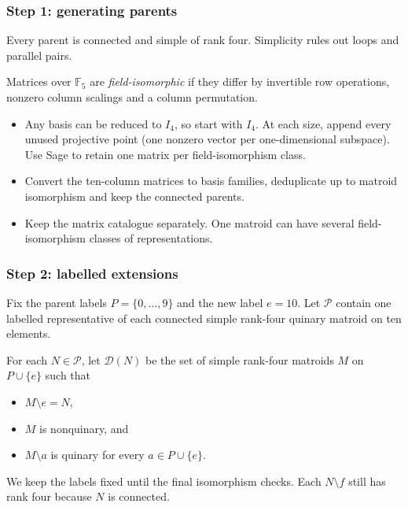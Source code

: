 \documentclass{beamer}
\newcommand{\F}{\mathbb{F}}
\begin{document}
\begin{frame}
  \frametitle{Step 1: generating parents}
  Every parent is connected and simple of rank four. Simplicity
  rules out loops and parallel pairs.

  \medskip
  Matrices over $\F_5$ are \emph{field-isomorphic} if they differ by
  invertible row operations, nonzero column scalings and a column
  permutation.
  \begin{itemize}
    \item Any basis can be reduced to $I_4$, so start with $I_4$.
      At each size, append every unused projective point (one nonzero
      vector per one-dimensional subspace). Use Sage to retain one
      matrix per field-isomorphism class.
    \item Convert the ten-column matrices to basis families, deduplicate
      up to matroid isomorphism and keep the connected parents.
    \item Keep the matrix catalogue separately. One matroid can have
      several field-isomorphism classes of representations.
  \end{itemize}
\end{frame}

\begin{frame}
  \frametitle{Step 2: labelled extensions}
  Fix the parent labels $P=\{0,\ldots,9\}$ and the new label $e=10$.
  Let $\mathcal P$ contain one labelled representative of each
  connected simple rank-four quinary matroid on ten elements.

  \medskip
  For each $N\in\mathcal P$, let $\mathcal D(N)$ be the set of simple
  rank-four matroids $M$ on $P\cup\{e\}$ such that
  \begin{itemize}
    \item $M\setminus e=N$,
    \item $M$ is nonquinary, and
    \item $M\setminus a$ is quinary for every $a\in P\cup\{e\}$.
  \end{itemize}
  We keep the labels fixed until the final isomorphism checks.
  Each $N\setminus f$ still has rank four because $N$ is connected.
\end{frame}
\end{document}
